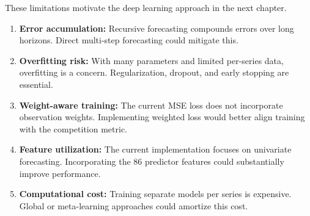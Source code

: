These limitations motivate the deep learning approach in the next chapter.
\begin{enumerate}
    \item \textbf{Error accumulation:} Recursive forecasting compounds errors over long horizons. Direct multi-step forecasting could mitigate this.
    \item \textbf{Overfitting risk:} With many parameters and limited per-series data, overfitting is a concern. Regularization, dropout, and early stopping are essential.
    \item \textbf{Weight-aware training:} The current MSE loss does not incorporate observation weights. Implementing weighted loss would better align training with the competition metric.
    \item \textbf{Feature utilization:} The current implementation focuses on univariate forecasting. Incorporating the 86 predictor features could substantially improve performance.
    \item \textbf{Computational cost:} Training separate models per series is expensive. Global or meta-learning approaches could amortize this cost.
\end{enumerate}

